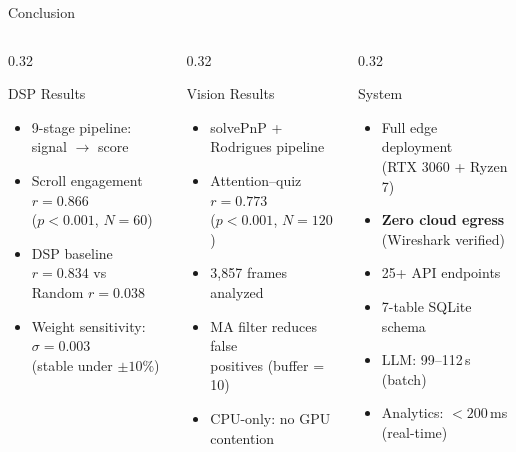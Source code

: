 \documentclass[aspectratio=169,10pt]{beamer}
\begin{document}
\begin{frame}{Conclusion}
\begin{columns}[T]
\begin{column}{0.32\textwidth}
\begin{block}{\centering DSP Results}
\begin{itemize}\scriptsize
  \item 9-stage pipeline: signal $\rightarrow$ score
  \item Scroll engagement $r = 0.866$\\($p < 0.001$, $N = 60$)
  \item DSP baseline $r = 0.834$ vs\\Random $r = 0.038$
  \item Weight sensitivity: $\sigma = 0.003$\\(stable under $\pm 10\%$)
\end{itemize}
\end{block}
\end{column}

\begin{column}{0.32\textwidth}
\begin{block}{\centering Vision Results}
\begin{itemize}\scriptsize
  \item solvePnP + Rodrigues pipeline
  \item Attention--quiz $r = 0.773$\\($p < 0.001$, $N = 120$)
  \item 3{,}857 frames analyzed
  \item MA filter reduces false\\positives (buffer = 10)
  \item CPU-only: no GPU contention
\end{itemize}
\end{block}
\end{column}

\begin{column}{0.32\textwidth}
\begin{block}{\centering System}
\begin{itemize}\scriptsize
  \item Full edge deployment\\(RTX 3060 + Ryzen 7)
  \item \textbf{Zero cloud egress}\\(Wireshark verified)
  \item 25+ API endpoints
  \item 7-table SQLite schema
  \item LLM: 99--112\,s (batch)
  \item Analytics: $< 200$\,ms (real-time)
\end{itemize}
\end{block}
\end{column}
\end{columns}


\end{frame}
\end{document}
